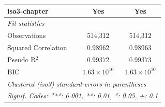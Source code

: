 \begin{tabular}{lcc}
   iso3-chapter                                                    & Yes                   & Yes\\  
   \midrule
   \emph{Fit statistics}\\
   Observations                                                    & 514,312               & 514,312\\  
   Squared Correlation                                             & 0.98962               & 0.98963\\  
   Pseudo R$^2$                                                    & 0.99372               & 0.99373\\  
   BIC                                                             & $1.63\times 10^{10}$  & $1.63\times 10^{10}$\\   
   \midrule \midrule
   \multicolumn{3}{l}{\emph{Clustered (iso3) standard-errors in parentheses}}\\
   \multicolumn{3}{l}{\emph{Signif. Codes: ***: 0.001, **: 0.01, *: 0.05, +: 0.1}}\\
\end{tabular}
\par\endgroup


